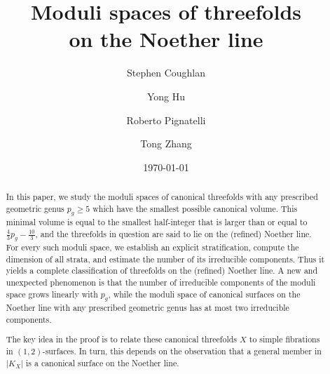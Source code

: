 \documentclass[a4paper,11pt]{amsart}
\theoremstyle{definition}
\theoremstyle{remark}
\numberwithin{equation}{section}
\begin{document}
   


\title[Moduli spaces of threefolds on the Noether line]{Moduli spaces of threefolds \\ on the Noether line}


\author{Stephen Coughlan}
\author{Yong Hu}
\author{Roberto Pignatelli}
\author{Tong Zhang}
\date{\today}
	
\address[S.C.]{Department of Mathematics and Computer Studies, Mary Immaculate College, South Circular Road, Limerick (Ireland)}

\address[Y.H.]{School of Mathematical Sciences, Shanghai Jiao Tong University, 800 Dongchuan Road, Shanghai (China)}

\address[R.P.]{Dipartimento di Matematica dell'Universit\`a di Trento, via Sommarive 14, I-38123, Trento (Italy)}

\address[T.Z.]{School of Mathematical Sciences, Ministry of Education Key Laboratory of Mathematics and Engineering Applications \& Shanghai Key Laboratory of PMMP, East China Normal University, Shanghai (China)}

\begin{abstract}
    In this paper, we study the moduli spaces of canonical threefolds with any prescribed geometric genus $p_g \ge 5$ which have the smallest possible canonical volume. This minimal volume is equal to the smallest half-integer that is larger than or equal to $\frac43 p_g -\frac{10}3$, and the threefolds in question are said to lie on the (refined) Noether line. For every such moduli space, we establish an explicit stratification, compute the dimension of all strata, and estimate the number of its irreducible components. Thus it yields a complete classification of threefolds on the (refined) Noether line. A new and unexpected phenomenon is that the number of irreducible components of the moduli space grows linearly with $p_g$, while the moduli space of canonical surfaces on the Noether line with any prescribed geometric genus has at most two irreducible components.
    
    The key idea in the proof is to relate these canonical threefolds $X$ to simple fibrations in $(1, 2)$-surfaces. In turn, this depends on the observation that a general member in $|K_X|$ is a canonical surface on the Noether line.
\end{abstract}
	

	
\end{document}
